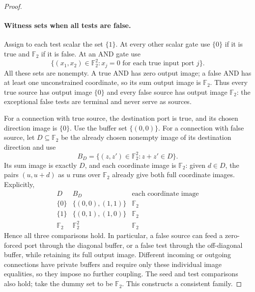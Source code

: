 \documentclass[11pt]{article}
\theoremstyle{definition}
\newcommand{\F}{\mathbb F_2}
\begin{document}
\begin{proof}
\paragraph{Witness sets when all tests are false.}
Assign to each test scalar the set $\{1\}$. At every other scalar gate
use $\{0\}$ if it is true and $\F$ if it is false. At an AND gate use
\begin{equation}\label{eq:consistency-and-witness}
 \{(x_1,x_2)\in\F^2:
       x_j=0\text{ for each true input port }j\}.
\end{equation}
All these sets are nonempty. A true AND has zero output image; a false
AND has at least one unconstrained coordinate, so its sum output image
is $\F$. Thus every true source has output image $\{0\}$ and every
false source has output image $\F$: the exceptional false tests are
terminal and never serve as sources.

For a connection with true source, the destination port is true, and its
chosen direction image is $\{0\}$. Use the buffer set $\{(0,0)\}$.
For a connection with false source, let $D\subseteq\F$ be the already
chosen nonempty image of its destination direction and use
\begin{equation}\label{eq:consistency-fiber}
 B_D=\{(z,z')\in\F^2:z+z'\in D\}.
\end{equation}
Its sum image is exactly $D$, and each coordinate image is $\F$:
given $d\in D$, the pairs $(u,u+d)$ as $u$ runs over $\F$ already
give both full coordinate images. Explicitly,
\[
\begin{array}{c|c|c}
 D & B_D & \text{each coordinate image}\\ \hline
 \{0\} & \{(0,0),(1,1)\} & \F\\
 \{1\} & \{(0,1),(1,0)\} & \F\\
 \F & \F^2 & \F
\end{array}
\]
Hence all three comparisons hold. In particular, a false source can feed
a zero-forced port through the diagonal buffer, or a false test through
the off-diagonal buffer, while retaining its full output image. Different
incoming or outgoing connections have private buffers and require only
these individual image equalities, so they impose no further coupling.
The seed and test comparisons also hold; take the dummy set to be $\F$.
This constructs a consistent family.


\end{proof}
\end{document}
